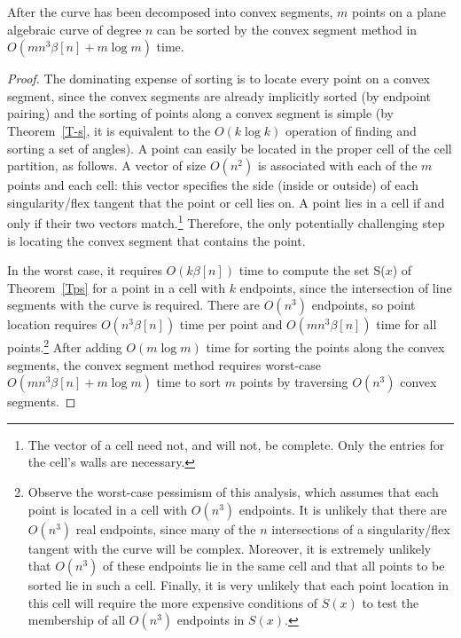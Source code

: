 \begin{theorem}
After the curve has been decomposed into convex segments,
$m$ points on a plane algebraic curve of degree $n$ can be sorted
by the convex segment method in $O(m n^{3} \beta[n] + m\log m)$ time.
\end{theorem}
%
\begin{proof}
The dominating expense of sorting is to locate every point on a convex segment,
since the convex segments are already implicitly sorted (by endpoint pairing) and 
the sorting of points along a convex segment is simple
(by Theorem~\ref{T-s}, it is equivalent to the $O(k \log k)$ operation of finding
and sorting a set of angles). 
A point can easily be located in the proper cell of the cell partition, as follows.
A vector of size $O(n^{2})$ is associated with each of the $m$ points and each
cell: this vector specifies the side (inside or outside) of each singularity/flex tangent
that the point or cell lies on.
A point lies in a cell if and only if their two vectors match.\footnote{The vector
	of a cell need not, and will not, be complete.  Only the entries for the
	cell's walls are necessary.}
Therefore, the only potentially challenging step is locating the convex segment
that contains the point.

In the worst case, it requires $O(k \beta[n])$ time to compute the set 
S($x$) of Theorem~\ref{Tps} for a point in a cell with $k$ endpoints, since
the intersection of line segments with the curve is required.
There are $O(n^{3})$ endpoints, so point location requires $O(n^{3}\beta[n])$ time per
point and $O(mn^{3}\beta[n])$ time for all points.\footnote{Observe the worst-case
	pessimism of this analysis, which assumes that each point is located in a cell
	with $O(n^{3})$ endpoints.
	It is unlikely that there are $O(n^{3})$
	real endpoints, since many of the $n$ intersections of a singularity/flex
	tangent with the curve will be complex.  
	Moreover, it is extremely unlikely that $O(n^{3})$
	of these endpoints lie in the same cell and that all points to be sorted
	lie in such a cell.
	Finally, it is very unlikely that each point location in this cell will 
	require the more expensive conditions
	of $S(x)$ to test the membership of all $O(n^{3})$ endpoints in $S(x)$.}
After adding $O(m \log m)$ time for sorting the points along the convex segments,
the convex segment method requires worst-case $O(mn^{3}\beta[n] + m \log m)$ 
time to sort $m$ points by traversing $O(n^{3})$ convex segments.
\end{proof}

